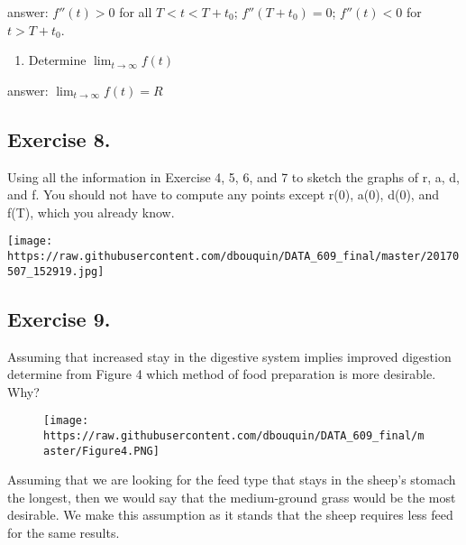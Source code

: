 \documentclass[]{article}
\providecommand{\tightlist}{%
  \setlength{\itemsep}{0pt}\setlength{\parskip}{0pt}}
\begin{document}
answer: \(f''(t) > 0\) for all \(T < t < T + t_0\); \(f''(T + t_0) =0\);
\(f''(t) < 0\) for \(t > T + t_0\).

\begin{enumerate}
\def\labelenumi{(\alph{enumi})}
\setcounter{enumi}{2}
\tightlist
\item
  Determine \(\lim_{t\to\infty}f(t)\)
\end{enumerate}

answer: \(\lim_{t\to\infty}f(t) = R\)

\subsection{Exercise 8.}\label{exercise-8.}

Using all the information in Exercise 4, 5, 6, and 7 to sketch the
graphs of r, a, d, and f. You should not have to compute any points
except r(0), a(0), d(0), and f(T), which you already know.

\texttt{[image: https://raw.githubusercontent.com/dbouquin/DATA\_609\_final/master/20170507\_152919.jpg]}
\newpage

\subsection{Exercise 9.}\label{exercise-9.}

Assuming that increased stay in the digestive system implies improved
digestion determine from Figure 4 which method of food preparation is
more desirable. Why?

\begin{figure}[htbp]
\centering
\texttt{[image: https://raw.githubusercontent.com/dbouquin/DATA\_609\_final/master/Figure4.PNG]}
\caption{}
\end{figure}

Assuming that we are looking for the feed type that stays in the sheep's
stomach the longest, then we would say that the medium-ground grass
would be the most desirable. We make this assumption as it stands that
the sheep requires less feed for the same results.
\end{document}
